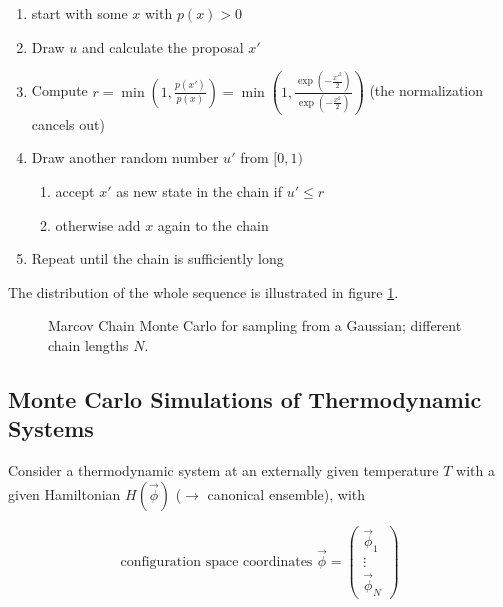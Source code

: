 \begin{enumerate}
    \item start with some $x$ with $p(x) > 0$
    \item Draw $u$ and calculate the proposal $x'$
    \item Compute $r = \min{\left(1,\frac{p(x')}{p(x)} \right)} = \min{\left(1,\frac{\exp{\left(-\frac{x'^2}{2} \right)}}{\exp{\left(-\frac{x^2}{2} \right)}} \right)}$ (the normalization cancels out)
    \item Draw another random number $u'$ from $[0,1)$
    \begin{enumerate}
        \item accept $x'$ as new state in the chain if $u' \leq r$
        \item otherwise add $x$ again to the chain
    \end{enumerate}
    \item Repeat until the chain is sufficiently long
\end{enumerate}

The distribution of the whole sequence is illustrated in figure \ref{fig:mcmc}.

\begin{figure}[!htb]
 \centering
 \hfill
 \caption{Marcov Chain Monte Carlo for sampling from a Gaussian; different chain lengths $N$.}
 \label{fig:mcmc}
\end{figure}

\subsection{Monte Carlo Simulations of Thermodynamic Systems}
Consider a thermodynamic system at an externally given temperature $T$
with a given Hamiltonian $H(\vec{\phi})$ ($\rightarrow$ canonical ensemble), with

\begin{equation}
    \text{configuration space coordinates }\vec{\phi} = \left( \begin{array}{c}
        \vec{\phi}_1 \\
        \vdots \\
        \vec{\phi}_N
    \end{array}\right)
\end{equation}

